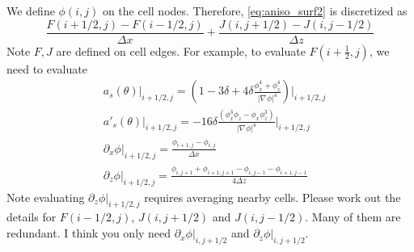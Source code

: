 \documentclass[a4paper,12pt]{article}
\newcommand{\grad}[1]{\nabla_{#1}}
\begin{document}
We define $\phi(i,j)$ on the cell nodes. Therefore, \cref{eq:aniso_surf2} is discretized as
\begin{equation}
\frac{F(i+1/2, j) - F(i-1/2,j)}{\Delta x} + \frac{J(i,j+1/2)-J(i,j-1/2)}{\Delta z}
\end{equation}
Note $F,J$ are defined on cell edges. For example, to evaluate $F(i+\frac{1}{2},j)$, we need to evaluate
\begin{align}
& a_s(\theta) \bigg|_{i+1/2,j} = \left( 1-3\delta + 4\delta  \frac{\phi_x^4 +  \phi_z^4}{|\grad{} \phi|^4} \right)\bigg|_{i+1/2,j} \\
& a'_s(\theta) \bigg|_{i+1/2,j} = -16\delta  \frac{(\phi_x^3 \phi_z- \phi_x \phi_z^3 )}{|\grad{} \phi|^4} \bigg|_{i+1/2,j}\\
& \partial_x \phi \bigg|_{i+1/2,j} = \frac{\phi_{i+1,j}-\phi_{i,j}}{\Delta x} \\
& \partial_z \phi \bigg|_{i+1/2,j}  = \frac{\phi_{i,j+1}+\phi_{i+1,j+1}-\phi_{i,j-1}-\phi_{i+1,j-1}}{4\Delta z} 
\end{align}
Note evaluating $\partial_z \phi |_{i+1/2,j}$ requires averaging nearby cells.  Please work out the details for $F(i-1/2,j)$, $J(i,j+1/2)$ and $J(i,j-1/2)$. Many of them are redundant. I think you only need 
$\partial_x \phi |_{i,j+1/2}$ and $\partial_z \phi |_{i,j+1/2}$.
\end{document}
